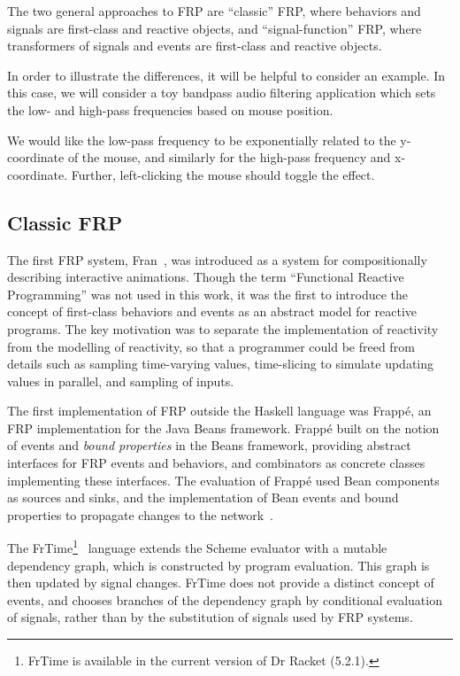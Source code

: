 The two general approaches to FRP are ``classic'' FRP, where behaviors and signals are first-class and reactive objects, and ``signal-function'' FRP,
where transformers of signals and events are first-class and reactive objects.

In order to illustrate the differences, it will be helpful to consider an example. In this case, we will consider
a toy bandpass audio filtering application which sets the low- and high-pass frequencies based on mouse position.

We would like the low-pass frequency to be exponentially related to the y-coordinate of the mouse, and similarly for the
high-pass frequency and x-coordinate. Further, left-clicking the mouse should toggle the effect.

\subsection{Classic FRP}
\label{subsection:classic_frp}

The first FRP system, Fran~\cite{Elliott1997}, was introduced as a system for compositionally describing interactive animations.
Though the term ``Functional Reactive Programming'' was not used in this work, it was the first to introduce the concept of first-class
behaviors and events as an abstract model for reactive programs. The key motivation was to separate the implementation of reactivity
from the modelling of reactivity, so that a programmer could be freed from details such as sampling time-varying values, time-slicing
to simulate updating values in parallel, and sampling of inputs.

The first implementation of FRP outside the Haskell language was Frapp\'{e}, an FRP implementation for the Java Beans framework. Frapp\'{e} built on
the notion of events and {\em bound properties} in the Beans framework, providing abstract interfaces for FRP events and behaviors, and combinators
as concrete classes implementing these interfaces. The evaluation of Frapp\'{e} used Bean components as sources and sinks, and the implementation of
Bean events and bound properties to propagate changes to the network~\cite{Courtney2001-2}.


The FrTime\footnote{FrTime is available in the current version of Dr Racket (5.2.1).}~\cite{Cooper2006} language extends the Scheme evaluator with a mutable
dependency graph, which is constructed by program evaluation. This graph is then updated by signal changes. FrTime does not provide a distinct concept of
events, and chooses branches of the dependency graph by conditional evaluation of signals, rather than by the substitution of signals used by FRP systems.

